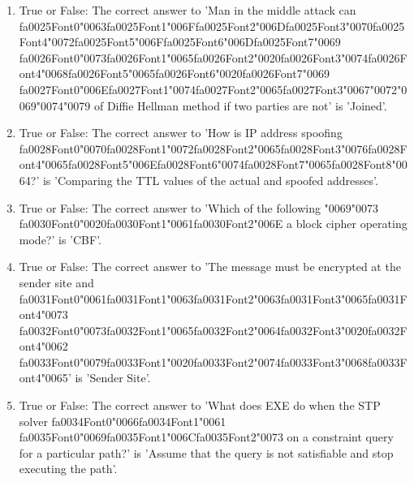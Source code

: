 \documentclass[12pt]{article}
\begin{document}
\begin{enumerate}[label=\arabic*.]
\item True or False: The correct answer to 'Man in the middle attack can {\csname fa0025Font0\endcsname\char"0063}{\csname fa0025Font1\endcsname\char"006F}{\csname fa0025Font2\endcsname\char"006D}{\csname fa0025Font3\endcsname\char"0070}{\csname fa0025Font4\endcsname\char"0072}{\csname fa0025Font5\endcsname\char"006F}{\csname fa0025Font6\endcsname\char"006D}{\csname fa0025Font7\endcsname\char"0069} {\csname fa0026Font0\endcsname\char"0073}{\csname fa0026Font1\endcsname\char"0065}{\csname fa0026Font2\endcsname\char"0020}{\csname fa0026Font3\endcsname\char"0074}{\csname fa0026Font4\endcsname\char"0068}{\csname fa0026Font5\endcsname\char"0065}{\csname fa0026Font6\endcsname\char"0020}{\csname fa0026Font7\endcsname\char"0069} {\csname fa0027Font0\endcsname\char"006E}{\csname fa0027Font1\endcsname\char"0074}{\csname fa0027Font2\endcsname\char"0065}{\csname fa0027Font3\endcsname\char"0067}{\char"0072}{\char"0069}{\char"0074}{\char"0079} of Diffie Hellman method if two parties are not' is 'Joined'.
\item True or False: The correct answer to 'How is IP address spoofing {\csname fa0028Font0\endcsname\char"0070}{\csname fa0028Font1\endcsname\char"0072}{\csname fa0028Font2\endcsname\char"0065}{\csname fa0028Font3\endcsname\char"0076}{\csname fa0028Font4\endcsname\char"0065}{\csname fa0028Font5\endcsname\char"006E}{\csname fa0028Font6\endcsname\char"0074}{\csname fa0028Font7\endcsname\char"0065}{\csname fa0028Font8\endcsname\char"0064}?' is 'Comparing the TTL values of the actual and spoofed addresses'.
\item True or False: The correct answer to 'Which of the following {\char"0069}{\char"0073} {\csname fa0030Font0\endcsname\char"0020}{\csname fa0030Font1\endcsname\char"0061}{\csname fa0030Font2\endcsname\char"006E} a block cipher operating mode?' is 'CBF'.
\item True or False: The correct answer to 'The message must be encrypted at the sender site and {\csname fa0031Font0\endcsname\char"0061}{\csname fa0031Font1\endcsname\char"0063}{\csname fa0031Font2\endcsname\char"0063}{\csname fa0031Font3\endcsname\char"0065}{\csname fa0031Font4\endcsname\char"0073} {\csname fa0032Font0\endcsname\char"0073}{\csname fa0032Font1\endcsname\char"0065}{\csname fa0032Font2\endcsname\char"0064}{\csname fa0032Font3\endcsname\char"0020}{\csname fa0032Font4\endcsname\char"0062} {\csname fa0033Font0\endcsname\char"0079}{\csname fa0033Font1\endcsname\char"0020}{\csname fa0033Font2\endcsname\char"0074}{\csname fa0033Font3\endcsname\char"0068}{\csname fa0033Font4\endcsname\char"0065}' is 'Sender Site'.
\item True or False: The correct answer to 'What does EXE do when the STP solver {\csname fa0034Font0\endcsname\char"0066}{\csname fa0034Font1\endcsname\char"0061} {\csname fa0035Font0\endcsname\char"0069}{\csname fa0035Font1\endcsname\char"006C}{\csname fa0035Font2\endcsname\char"0073} on a constraint query for a particular path?' is 'Assume that the query is not satisfiable and stop executing the path'.
\end{enumerate}
\end{document}
